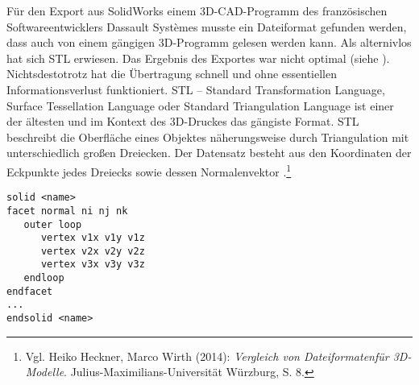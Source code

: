 Für den Export aus SolidWorks einem 3D-CAD-Programm des französischen Softwareentwicklers Dassault Systèmes musste ein Dateiformat gefunden werden, dass auch von einem gängigen 3D-Programm gelesen werden kann. Als alternivlos hat sich STL erwiesen. Das Ergebnis des Exportes war nicht optimal (siehe ). Nichtsdestotrotz hat die Übertragung schnell und ohne essentiellen Informationsverlust funktioniert.
STL -- Standard Transformation Language,  Surface Tessellation Language oder Standard Triangulation Language ist einer der ältesten und im Kontext des 3D-Druckes das gängiste Format.  
STL beschreibt die Oberfläche eines Objektes näherungsweise durch Triangulation mit unterschiedlich großen Dreiecken. Der Datensatz besteht aus den Koordinaten der Eckpunkte jedes Dreiecks sowie dessen Normalenvektor .\footnote{Vgl. Heiko Heckner, Marco Wirth (2014): \textit{Vergleich von Dateiformatenfür 3D-Modelle}. Julius-Maximilians-Universität Würzburg, S. 8.}


\begin{lstlisting}[caption={STL ASCII Schema.}, captionpos=b, label={lst:STL ASCII}]
solid <name>
facet normal ni nj nk
   outer loop
      vertex v1x v1y v1z
      vertex v2x v2y v2z
      vertex v3x v3y v3z
   endloop
endfacet
...
endsolid <name>

\end{lstlisting}

